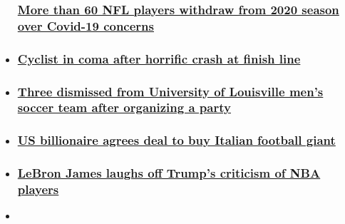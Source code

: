 \begin{itemize}
{  \subsubsection{\texorpdfstring{\href{/2020/08/07/sport/nfl-players-withdraw-2020-spt-intl/index.html}{More
  than 60 NFL players withdraw from 2020 season over Covid-19
  concerns}}{More than 60 NFL players withdraw from 2020 season over Covid-19 concerns}}\label{more-than-60-nfl-players-withdraw-from-2020-season-over-covid-19-concerns}}
\item
  \hypertarget{cyclist-in-coma-after-horrific-crash-at-finish-line}{%
  \subsubsection{\texorpdfstring{\href{/2020/08/06/sport/fabio-jakobsen-tour-of-poland-crash-cycling-spt-intl/index.html}{Cyclist
  in coma after horrific crash at finish
  line}}{Cyclist in coma after horrific crash at finish line}}\label{cyclist-in-coma-after-horrific-crash-at-finish-line}}
\item
  \hypertarget{three-dismissed-from-university-of-louisville-mens-soccer-team-after-organizing-a-party}{%
  \subsubsection{\texorpdfstring{\href{/2020/08/07/us/university-of-louisville-soccer-players-dismissed-coronavirus-party/index.html}{Three
  dismissed from University of Louisville men's soccer team after
  organizing a
  party}}{Three dismissed from University of Louisville men's soccer team after organizing a party}}\label{three-dismissed-from-university-of-louisville-mens-soccer-team-after-organizing-a-party}}
\item
  \hypertarget{us-billionaire-agrees-deal-to-buy-italian-football-giant}{%
  \subsubsection{\texorpdfstring{\href{/2020/08/06/football/as-roma-dan-friedkin-sale-scli-spt-intl/index.html}{US
  billionaire agrees deal to buy Italian football
  giant}}{US billionaire agrees deal to buy Italian football giant}}\label{us-billionaire-agrees-deal-to-buy-italian-football-giant}}
\item
  \hypertarget{lebron-james-laughs-off-trumps-criticism-of-nba-players}{%
  \subsubsection{\texorpdfstring{\href{/2020/08/06/sport/lebron-james-trump-nba-viewership-spt-intl/index.html}{LeBron
  James laughs off Trump's criticism of NBA
  players}}{LeBron James laughs off Trump's criticism of NBA players}}\label{lebron-james-laughs-off-trumps-criticism-of-nba-players}}
\item
  \hypertarget{tiger-woods-confident-of-adding-to-major-tally-at-pga-championship}{%
}
\end{itemize}
